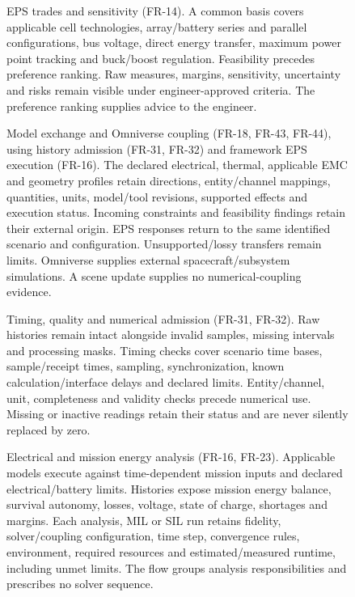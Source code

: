 \begin{figure}[H]
\centering
{}
\caption[EPS trades and sensitivity.]{EPS trades and sensitivity (FR-14). A common basis covers applicable cell technologies, array/battery series and parallel configurations, bus voltage, direct energy transfer, maximum power point tracking and buck/boost regulation. Feasibility precedes preference ranking. Raw measures, margins, sensitivity, uncertainty and risks remain visible under engineer-approved criteria. The preference ranking supplies advice to the engineer.}
\label{fig:fr-flow-09}
\end{figure}
\clearpage

\begin{figure}[H]
\centering
{}
\caption[Model exchange and Omniverse coupling.]{Model exchange and Omniverse coupling (FR-18, FR-43, FR-44), using history admission (FR-31, FR-32) and framework EPS execution (FR-16). The declared electrical, thermal, applicable EMC and geometry profiles retain directions, entity/channel mappings, quantities, units, model/tool revisions, supported effects and execution status. Incoming constraints and feasibility findings retain their external origin. EPS responses return to the same identified scenario and configuration. Unsupported/lossy transfers remain limits. Omniverse supplies external spacecraft/subsystem simulations. A scene update supplies no numerical-coupling evidence.}
\label{fig:fr-flow-10}
\end{figure}
\clearpage

\begin{figure}[H]
\centering
{}
\caption[Timing, quality and numerical admission.]{Timing, quality and numerical admission (FR-31, FR-32). Raw histories remain intact alongside invalid samples, missing intervals and processing masks. Timing checks cover scenario time bases, sample/receipt times, sampling, synchronization, known calculation/interface delays and declared limits. Entity/channel, unit, completeness and validity checks precede numerical use. Missing or inactive readings retain their status and are never silently replaced by zero.}
\label{fig:fr-flow-11}
\end{figure}
\clearpage

\begin{figure}[H]
\centering
{}
\caption[Electrical and mission energy analysis.]{Electrical and mission energy analysis (FR-16, FR-23). Applicable models execute against time-dependent mission inputs and declared electrical/battery limits. Histories expose mission energy balance, survival autonomy, losses, voltage, state of charge, shortages and margins. Each analysis, MIL or SIL run retains fidelity, solver/coupling configuration, time step, convergence rules, environment, required resources and estimated/measured runtime, including unmet limits. The flow groups analysis responsibilities and prescribes no solver sequence.}
\label{fig:fr-flow-12}
\end{figure}
\clearpage

